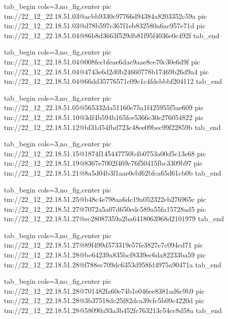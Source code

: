  
 
 
 
 

\qqSecCmtScr


\ifcmt
  tab_begin cols=3,no_fig,center
    pic tm://22_12_22.18.51.03@acbb9330c97766d94384a8203352c59a
    pic tm://22_12_22.18.51.03@d78b597c367f1eb832580a6ac957e71d
    pic tm://22_12_22.18.51.04@86b8d3663f529db81f95f4036e0c492f
  tab_end
\fi


\ifcmt
  tab_begin cols=3,no_fig,center
    pic tm://22_12_22.18.51.04@008fecbfeae6dae9aae8ce70c30e6d9f
    pic tm://22_12_22.18.51.04@4743e6d2d0b24660778b17469b26d9a4
    pic tm://22_12_22.18.51.04@66dd35776571c09c1c4fdebbbf204112
  tab_end
\fi


\ifcmt
  tab_begin cols=3,no_fig,center
    pic tm://22_12_22.18.51.05@565332da51160e75a1f425955f5ae609
    pic tm://22_12_22.18.51.10@3df4b594b165fce5366c30e276054822
    pic tm://22_12_22.18.51.12@bf31d54fbd723c48ee09bec99f22859b
  tab_end
\fi


\ifcmt
  tab_begin cols=3,no_fig,center
    pic tm://22_12_22.18.51.15@1874f145447750b4b0753a00d5c13e68
    pic tm://22_12_22.18.51.19@8367e7002f469c76f50415fbc3309b97
    pic tm://22_12_22.18.51.21@8a5d04b3f1aae0cbf62bfca65d61cb0b
  tab_end
\fi


\ifcmt
  tab_begin cols=3,no_fig,center
    pic tm://22_12_22.18.51.25@b48c4e798aa6dc19a052322eb276965c
    pic tm://22_12_22.18.51.27@7072a5a07d650edc589a55fa15728ad5
    pic tm://22_12_22.18.51.27@ec28087359a2ba6418063968d2101979
  tab_end
\fi


\ifcmt
  tab_begin cols=3,no_fig,center
    pic tm://22_12_22.18.51.27@89f499d573319e57fe3827e7c094cd71
    pic tm://22_12_22.18.51.28@bc64239a835bcf8339ec6da82233ba59
    pic tm://22_12_22.18.51.28@f788ec709dc6353d958fd4975a90471a
  tab_end
\fi


\ifcmt
  tab_begin cols=3,no_fig,center
    pic tm://22_12_22.18.51.28@701482fa60e74b1e046ee8381ad6c9b9
    pic tm://22_12_22.18.51.28@3b37518dc25f82dca39cfc5b09c4220d
    pic tm://22_12_22.18.51.28@58090a93a3b452fc763213c54cc8d58a
  tab_end
\fi

